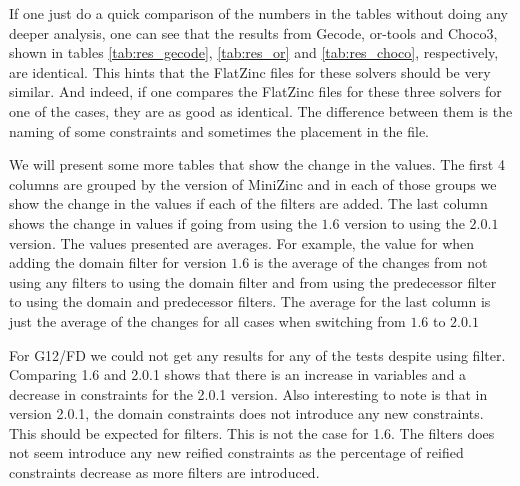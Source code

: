 









If one just do a quick comparison of the numbers in the tables without doing any deeper analysis, one can see that the results from Gecode, or-tools and Choco3, shown in tables \ref{tab:res_gecode}, \ref{tab:res_or} and \ref{tab:res_choco}, respectively, are identical. This hints that the FlatZinc files for these solvers should be very similar. And indeed, if one compares the FlatZinc files for these three solvers for one of the cases, they are as good as identical. The difference between them is the naming of some constraints and sometimes the placement in the file.

We will present some more tables that show the change in the values. The first 4 columns are grouped by the version of MiniZinc and in each of those groups we show the change in the values if each of the filters are added. The last column shows the change in values if going from using the $1.6$ version to using the $2.0.1$ version. The values presented are averages. For example, the value for when adding the domain filter for version $1.6$ is the average of the changes from not using any filters to using the domain filter and from using the predecessor filter to using the domain and predecessor filters. The average for the last column is just the average of the changes for all cases when switching from $1.6$ to $2.0.1$









For G12/FD we could not get any results for any of the tests despite using filter. Comparing 1.6 and 2.0.1 shows that there is an increase in variables and a decrease in constraints for the 2.0.1 version. Also interesting to note is that in version 2.0.1, the domain constraints does not introduce any new constraints. This should be expected for filters. This is not the case for 1.6. The filters does not seem introduce any new reified constraints as the percentage of reified constraints decrease as more filters are introduced.
